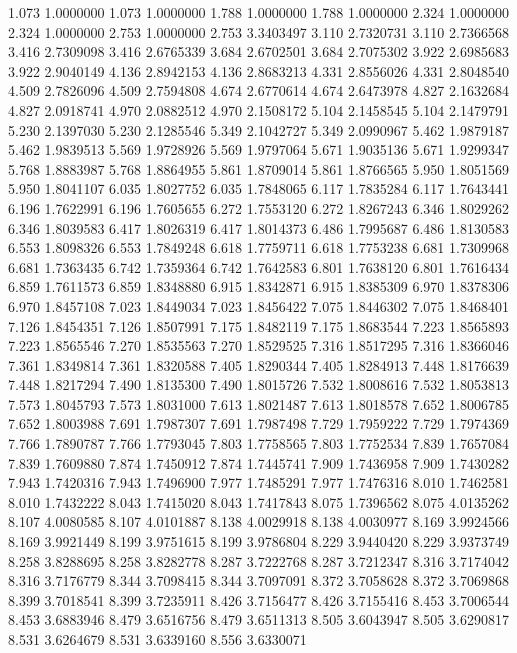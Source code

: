 1.073 1.0000000
1.073 1.0000000
1.788 1.0000000
1.788 1.0000000
2.324 1.0000000
2.324 1.0000000
2.753 1.0000000
2.753 3.3403497
3.110 2.7320731
3.110 2.7366568
3.416 2.7309098
3.416 2.6765339
3.684 2.6702501
3.684 2.7075302
3.922 2.6985683
3.922 2.9040149
4.136 2.8942153
4.136 2.8683213
4.331 2.8556026
4.331 2.8048540
4.509 2.7826096
4.509 2.7594808
4.674 2.6770614
4.674 2.6473978
4.827 2.1632684
4.827 2.0918741
4.970 2.0882512
4.970 2.1508172
5.104 2.1458545
5.104 2.1479791
5.230 2.1397030
5.230 2.1285546
5.349 2.1042727
5.349 2.0990967
5.462 1.9879187
5.462 1.9839513
5.569 1.9728926
5.569 1.9797064
5.671 1.9035136
5.671 1.9299347
5.768 1.8883987
5.768 1.8864955
5.861 1.8709014
5.861 1.8766565
5.950 1.8051569
5.950 1.8041107
6.035 1.8027752
6.035 1.7848065
6.117 1.7835284
6.117 1.7643441
6.196 1.7622991
6.196 1.7605655
6.272 1.7553120
6.272 1.8267243
6.346 1.8029262
6.346 1.8039583
6.417 1.8026319
6.417 1.8014373
6.486 1.7995687
6.486 1.8130583
6.553 1.8098326
6.553 1.7849248
6.618 1.7759711
6.618 1.7753238
6.681 1.7309968
6.681 1.7363435
6.742 1.7359364
6.742 1.7642583
6.801 1.7638120
6.801 1.7616434
6.859 1.7611573
6.859 1.8348880
6.915 1.8342871
6.915 1.8385309
6.970 1.8378306
6.970 1.8457108
7.023 1.8449034
7.023 1.8456422
7.075 1.8446302
7.075 1.8468401
7.126 1.8454351
7.126 1.8507991
7.175 1.8482119
7.175 1.8683544
7.223 1.8565893
7.223 1.8565546
7.270 1.8535563
7.270 1.8529525
7.316 1.8517295
7.316 1.8366046
7.361 1.8349814
7.361 1.8320588
7.405 1.8290344
7.405 1.8284913
7.448 1.8176639
7.448 1.8217294
7.490 1.8135300
7.490 1.8015726
7.532 1.8008616
7.532 1.8053813
7.573 1.8045793
7.573 1.8031000
7.613 1.8021487
7.613 1.8018578
7.652 1.8006785
7.652 1.8003988
7.691 1.7987307
7.691 1.7987498
7.729 1.7959222
7.729 1.7974369
7.766 1.7890787
7.766 1.7793045
7.803 1.7758565
7.803 1.7752534
7.839 1.7657084
7.839 1.7609880
7.874 1.7450912
7.874 1.7445741
7.909 1.7436958
7.909 1.7430282
7.943 1.7420316
7.943 1.7496900
7.977 1.7485291
7.977 1.7476316
8.010 1.7462581
8.010 1.7432222
8.043 1.7415020
8.043 1.7417843
8.075 1.7396562
8.075 4.0135262
8.107 4.0080585
8.107 4.0101887
8.138 4.0029918
8.138 4.0030977
8.169 3.9924566
8.169 3.9921449
8.199 3.9751615
8.199 3.9786804
8.229 3.9440420
8.229 3.9373749
8.258 3.8288695
8.258 3.8282778
8.287 3.7222768
8.287 3.7212347
8.316 3.7174042
8.316 3.7176779
8.344 3.7098415
8.344 3.7097091
8.372 3.7058628
8.372 3.7069868
8.399 3.7018541
8.399 3.7235911
8.426 3.7156477
8.426 3.7155416
8.453 3.7006544
8.453 3.6883946
8.479 3.6516756
8.479 3.6511313
8.505 3.6043947
8.505 3.6290817
8.531 3.6264679
8.531 3.6339160
8.556 3.6330071
